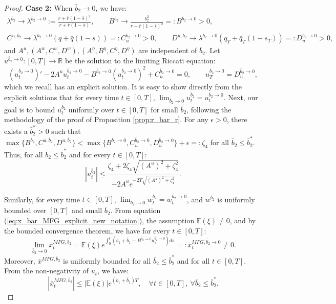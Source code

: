 \documentclass[11pt]{article}
\begin{document}
\begin{proof}
	\textbf{Case 2: } When $\bar{b}_2 \to 0$, we have:
	\begin{equation*}
	\begin{array}{l}
		 \lambda^{\bar{b}_2} \to \lambda^{\bar{b}_2 \to 0} := \frac{r + \bar{r}(1- \bar{s})^2}{r + \bar{r}(1-\bar{s})}, \qquad 
		 B^{\bar{b}_2} \to \frac{b_2^2}{r + \bar{r}(1-\bar{s})^2}=:B^{\bar{b}_2 \to 0} > 0,\\
		 C^{u,\bar{b}_2} \to \lambda^{\bar{b}_2 \to 0}(q+\bar{q}(1-s))=:C^{\bar{b}_2 \to 0}_u >0,\qquad 
		 D^{u,\bar{b}_2} \to \lambda^{\bar{b}_2 \to 0}(q_T+\bar{q}_T(1-s_T))=:D^{\bar{b}_2 \to 0}_u > 0,
	\end{array}
	\end{equation*}
	and $A^u, (A^w, C^w, D^w), (A^\eta, B^\eta, C^\eta, D^\eta)$ are independent of $\bar{b}_2$.	
	Let $u^{\bar{b}_2 \to 0}:[0,T]\to \mathbb{R}$ be the solution to the limiting Riccati equation:
	\begin{equation}
	\left({u}^{{\bar{b}_2 \to 0}}_t\right)' - 2A^u u_t^{\bar{b}_2 \to 0} -B^{\bar{b}_2 \to 0} (u_t^{\bar{b}_2 \to 0})^2+ C^{\bar{b}_2 \to 0}_u = 0, \qquad u_T^{\bar{b}_2 \to 0} = D^{\bar{b}_2 \to 0}_u,
	\label{eq:riccati_limiting_u}
	\end{equation}
	which we recall has an explicit solution. It is easy to show directly from the explicit solutions that for every time $t\in [0,T]$, $\lim_{\bar{b}_2 \to 0}u^{\bar{b}_2}_t=u^{\bar{b}_2 \to 0}_t$. Next, our goal is to bound $u^{\bar{b}_2}_t$ uniformly over $t \in [0,T]$ for small $\bar{b}_2$, following the methodology of the proof of Proposition \ref{prop:r_bar_r}. For any $\epsilon>0$, there exists a $\bar{b}^*_2>0$ such that $\max\{ B^{\bar{b}_2},C^{u,\bar{b}_2},D^{u,\bar{b}_2} \}<\max \{B^{\bar{b}_2 \to 0},C^{\bar{b}_2 \to 0}_u,D^{\bar{b}_2 \to 0}_u \}+\epsilon=:\zeta_4$ for all $\bar{b}_2 \leq \bar{b}^*_2$. Thus, for all $\bar{b}_2\leq \bar{b}^*_2$ and for every $t \in [0,T]$:
	\begin{equation*}
		\left \vert u_t^{\bar{b}_2} \right\vert \leq \frac{\zeta_4 + 2 \zeta_4 \sqrt{(A^u)^2 + \zeta_4^2}}{-2A^u e^{-2T \sqrt{(A^u)^2 + \zeta_4^2}}}.
	\end{equation*}
	
	Similarly, for every time $t\in [0,T]$, $\lim_{\bar{b}_2 \to 0}w^{\bar{b}_2}_t=w^{\bar{b}_2 \to 0}_t$, and  $w^{\bar{b}_2}$ is uniformly bounded over $[0,T]$ and small $\bar{b}_2$. From equation (\ref{eq:x_bar_MFG_explicit_new_notation}), the assumption $\mathbb{E}(\xi)\neq 0$, and by the bounded convergence theorem, we have for every $t \in [0,T]$:
   	\begin{equation}
   	\lim_{\bar{b}_2 \to 0} \bar{x}_t^{MFG,\bar{b}_2} = \mathbb{E}(\xi) e^{\int_0^t (b_1 + \bar{b}_1 - B^{\bar{b}_2 \to 0}u^{\bar{b}_2 \to 0}_s) ds} =: \bar{x}^{MFG,\bar{b}_2 \to 0}_t\neq 0.
   	\label{eq:x_bar_neq_0}
   	\end{equation}
	Moreover, $\bar{x}^{MFG,\bar{b}_2}$ is uniformly bounded for all $\bar{b}_2 \leq \bar{b}^*_2$ and for all $t \in [0,T]$. From the non-negativity of $u_t$, we have:
	$$ \left\vert \bar{x}^{MFG,\bar{b}_2}_t \right\vert \leq \left\vert \mathbb{E}(\xi) \right\vert e^{ (b_1 + \bar{b}_1 ) T }, \quad \forall t \in [0,T], \ \forall \bar{b}_2 \leq \bar{b}^*_2. $$ 
   	

\end{proof}
\end{document}

